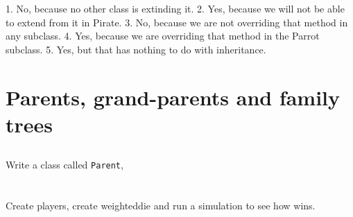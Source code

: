 \documentclass[a4paper, 11pt]{article}
\begin{document}
\begin{solution}
  1. No, because no other class is extinding it.
  2. Yes, because we will not be able to extend from it in Pirate.
  3. No, because we are not overriding that method in any subclass.
  4. Yes, because we are overriding that method in the Parrot subclass.
  5. Yes, but that has nothing to do with inheritance.
\end{solution}












\section{Parents, grand-parents and family trees}

\subsection{}

Write a class called \verb+Parent+, 




\section{}

Create players, create weighteddie and run a simulation to see how wins.
\end{document}
